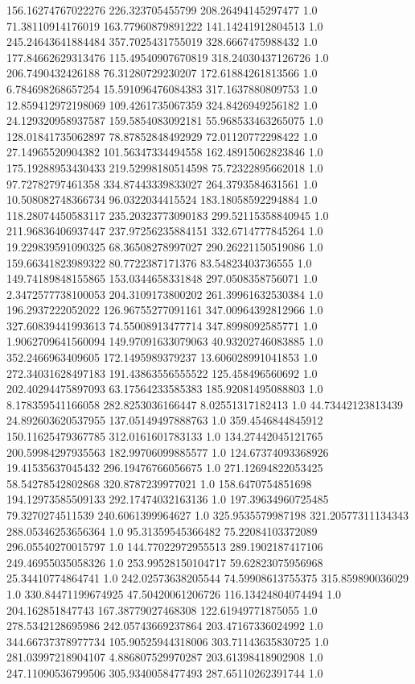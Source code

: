 156.16274767022276	226.323705455799	208.26494145297477	1.0
71.38110914176019	163.77960879891222	141.14241912804513	1.0
245.24643641884484	357.7025431755019	328.6667475988432	1.0
177.84662629313476	115.49540907670819	318.24030437126726	1.0
206.7490432426188	76.31280729230207	172.61884261813566	1.0
6.784698268657254	15.591096476084383	317.1637880809753	1.0
12.859412972198069	109.4261735067359	324.8426949256182	1.0
24.129320958937587	159.5854083092181	55.968533463265075	1.0
128.01841735062897	78.87852848492929	72.01120772298422	1.0
27.14965520904382	101.56347334494558	162.48915062823846	1.0
175.19288953430433	219.52998180514598	75.72322895662018	1.0
97.72782797461358	334.87443339833027	264.3793584631561	1.0
10.508082748366734	96.0322034415524	183.18058592294884	1.0
118.28074450583117	235.20323773090183	299.52115358840945	1.0
211.96836406937447	237.97256235884151	332.6714777845264	1.0
19.229839591090325	68.36508278997027	290.26221150519086	1.0
159.66341823989322	80.7722387171376	83.54823403736555	1.0
149.74189848155865	153.0344658331848	297.0508358756071	1.0
2.3472577738100053	204.3109173800202	261.39961632530384	1.0
196.2937222052022	126.96755277091161	347.00964392812966	1.0
327.60839441993613	74.55008913477714	347.8998092585771	1.0
1.9062709641560094	149.97091633079063	40.93202746083885	1.0
352.2466963409605	172.1495989379237	13.606028991041853	1.0
272.34031628497183	191.43863556555522	125.458496560692	1.0
202.40294475897093	63.17564233585383	185.92081495088803	1.0
8.178359541166058	282.8253036166447	8.02551317182413	1.0
44.73442123813439	24.892603620537955	137.05149497888763	1.0
359.4546844845912	150.11625479367785	312.0161601783133	1.0
134.27442045121765	200.59984297935563	182.99706099885577	1.0
124.67374093368926	19.41535637045432	296.19476766056675	1.0
271.12694822053425	58.54278542802868	320.8787239977021	1.0
158.6470754851698	194.12973585509133	292.17474032163136	1.0
197.39634960725485	79.3270274511539	240.6061399964627	1.0
325.9535579987198	321.20577311134343	288.05346253656364	1.0
95.31359545366482	75.22084103372089	296.05540270015797	1.0
144.77022972955513	289.1902187417106	249.46955035058326	1.0
253.99528150104717	59.62823075956968	25.34410774864741	1.0
242.02573638205544	74.59908613755375	315.859890036029	1.0
330.84471199674925	47.50420061206726	116.13424804074494	1.0
204.162851847743	167.38779027468308	122.61949771875055	1.0
278.5342128695986	242.05743669237864	203.47167336024992	1.0
344.66737378977734	105.90525944318006	303.71143635830725	1.0
281.03997218904107	4.886807529970287	203.61398418902908	1.0
247.11090536799506	305.9340058477493	287.65110262391744	1.0

